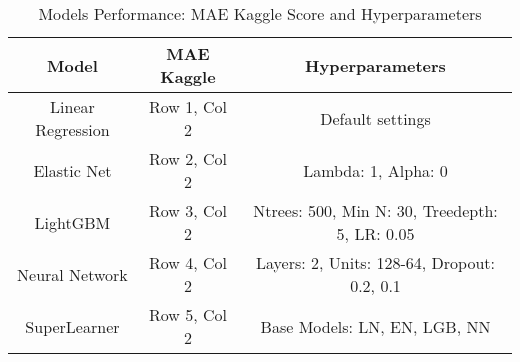 \begin{table}[H]
\centering
\begin{tabular}{|c|c|c|}
\hline
\textbf{Model} & \textbf{MAE Kaggle} & \textbf{Hyperparameters} \\ \hline
Linear Regression & Row 1, Col 2 & Default settings \\ \hline
Elastic Net & Row 2, Col 2 & Lambda: 1, Alpha: 0 \\ \hline
LightGBM & Row 3, Col 2 & Ntrees: 500, Min N: 30, Treedepth: 5, LR: 0.05 \\ \hline
Neural Network & Row 4, Col 2 & Layers: 2, Units: 128-64, Dropout: 0.2, 0.1 \\ \hline
SuperLearner & Row 5, Col 2 & Base Models: LN, EN, LGB, NN \\ \hline
\end{tabular}
\caption{Models Performance: MAE Kaggle Score and Hyperparameters}
\end{table}
